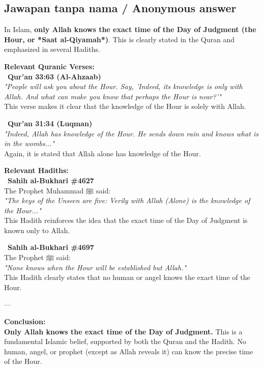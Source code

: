 \documentclass[11pt,a4paper]{article}
\newcommand{\ar}[1]{{\arabicfont #1}}
\begin{document}
\subsection*{Jawapan tanpa nama / Anonymous answer}
In Islam, \textbf{only Allah knows the exact time of the Day of Judgment (the Hour, or *Saat al-Qiyamah*)}. This is clearly stated in the Quran and emphasized in several Hadiths.\par\medskip \textbf{Relevant Quranic Verses:}\\ \textbullet\ \textbf{Qur’an 33:63 (Al-Ahzaab)}\\ \emph{\emph{"People will ask you about the Hour. Say, 'Indeed, its knowledge is only with Allah. And what can make you know that perhaps the Hour is near?'"}}\\ This verse makes it clear that the knowledge of the Hour is solely with Allah.\par\medskip \textbullet\ \textbf{Qur’an 31:34 (Luqman)}\\ \emph{\emph{"Indeed, Allah has knowledge of the Hour. He sends down rain and knows what is in the wombs..."}}\\ Again, it is stated that Allah alone has knowledge of the Hour.\par\medskip \textbf{Relevant Hadiths:}\\ \textbullet\ \textbf{Sahih al-Bukhari \#4627}\\ The Prophet Muhammad \ar{ﷺ} said:\\ \emph{\emph{"The keys of the Unseen are five: Verily with Allah (Alone) is the knowledge of the Hour..."}}\\ This Hadith reinforces the idea that the exact time of the Day of Judgment is known only to Allah.\par\medskip \textbullet\ \textbf{Sahih al-Bukhari \#4697}\\ The Prophet \ar{ﷺ} said:\\ \emph{\emph{"None knows when the Hour will be established but Allah."}}\\ This Hadith clearly states that no human or angel knows the exact time of the Hour.\par\medskip ---\par\medskip \textbf{Conclusion:}\\ \textbf{Only Allah knows the exact time of the Day of Judgment.} This is a fundamental Islamic belief, supported by both the Quran and the Hadith. No human, angel, or prophet (except as Allah reveals it) can know the precise time of the Hour.
\end{document}
